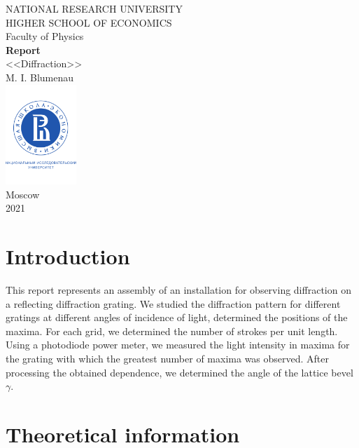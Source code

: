 \documentclass[a4paper, 12pt]{article}
\begin{document}
	\begin{titlepage}
		\begin{center}
			$$$$
			$$$$
			$$$$
			$$$$
			{\Large{NATIONAL RESEARCH UNIVERSITY}}\\
			\vspace{0.1cm}
			{\Large{HIGHER SCHOOL OF ECONOMICS}}\\
			\vspace{0.25cm}
			{\large{Faculty of Physics}}\\
			\vspace{5.5cm}
			{\Huge\textbf{{Report}}}\\%
			\vspace{1cm}
			{\LARGE{<<Diffraction>>}}\\%
			\vspace{1cm}
			{\large{M. I. Blumenau}}\\%
			\vspace{2cm}
			\vfill
			\includegraphics[width = 0.2\textwidth]{HSElogo}\\
			\vfill
			Moscow\\
			2021
		\end{center}
	\end{titlepage}
	
	\tableofcontents
	\newpage
	\section*{Introduction}
	This report represents an assembly of an installation for observing diffraction on a reflecting diffraction grating. We studied the diffraction pattern for different gratings at different angles of incidence of light, determined the positions of the maxima. For each grid, we determined the number of strokes per unit length. Using a photodiode power meter, we measured the light intensity in maxima for the grating with which the greatest number of maxima was observed. After processing the obtained dependence, we determined the angle of the lattice bevel $\gamma$.
	\section*{Theoretical information}
\end{document}
